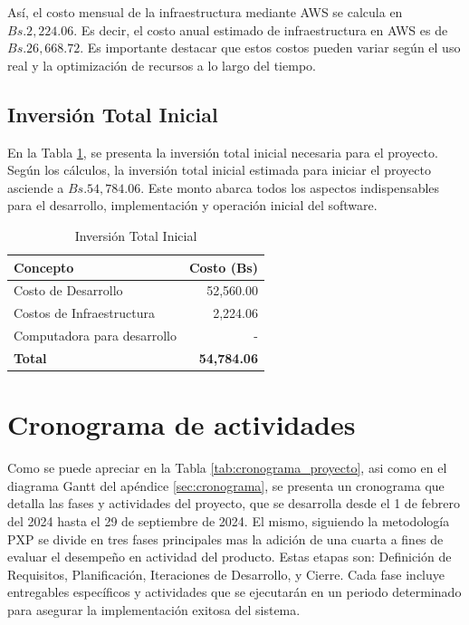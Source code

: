 Así, el costo mensual de la infraestructura mediante AWS se calcula en $Bs.2,224.06$. Es decir, el costo anual estimado de infraestructura en AWS es de $Bs.26,668.72$. Es importante destacar que estos costos pueden variar según el uso real y la optimización de recursos a lo largo del tiempo.

\subsection{Inversión Total Inicial}

En la Tabla \ref{tab:inversion_total}, se presenta la inversión total inicial necesaria para el proyecto. Según los cálculos, la inversión total inicial estimada para iniciar el proyecto asciende a $Bs.54,784.06$. Este monto abarca todos los aspectos indispensables para el desarrollo, implementación y operación inicial del software.

\begin{table}[ht]
    \centering
    \caption{Inversión Total Inicial}
    \label{tab:inversion_total}
    \begin{tabularx}{\textwidth}{|X|r|}
        \hline
        \textbf{Concepto} & \textbf{Costo (Bs)} \\
        \hline
        Costo de Desarrollo & 52,560.00 \\
        Costos de Infraestructura & 2,224.06 \\
        Computadora para desarrollo & - \\
        \hline
        \textbf{Total} & \textbf{54,784.06} \\
        \hline
    \end{tabularx}
\end{table}

\section{Cronograma de actividades}
Como se puede apreciar en la Tabla \ref{tab:cronograma_proyecto}, asi como en el diagrama Gantt del apéndice \ref{sec:cronograma}, se presenta un cronograma que detalla las fases y actividades del proyecto, que se desarrolla desde el 1 de febrero del 2024 hasta el 29 de septiembre de 2024. El mismo, siguiendo la metodología PXP se divide en tres fases principales mas la adición de una cuarta a fines de evaluar el desempeño en actividad del producto. Estas etapas son: Definición de Requisitos, Planificación, Iteraciones de Desarrollo, y Cierre. Cada fase incluye entregables específicos y actividades que se ejecutarán en un periodo determinado para asegurar la implementación exitosa del sistema.

